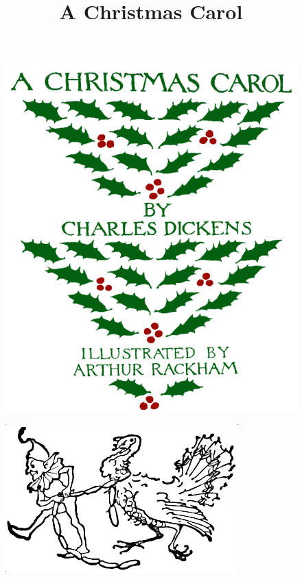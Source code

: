 \documentclass[paper=5.5in:8.5in,BCOR=5mm,twoside,DIV=calc,12pt,usegeometry]{scrbook} %
\begin{document}
\renewcommand*{\sectionmarkformat}{}
\renewcommand*\raggedchapter{\centering}
\pagestyle{empty}
\begin{figure}[p]
\begin{minipage}[c]{\linewidth}
\includegraphics[width=\linewidth]{newaccfront}
\end{minipage}
\end{figure}
\title{A Christmas Carol}


\renewcommand*{\chapterpagestyle}{empty}
\tableofcontents
\begin{figure}
\centering
\includegraphics[width=0.8\textwidth]{elfturkey}
\end{figure}
\clearpage
\pagestyle{headings}
\renewcommand*{\chapterpagestyle}{plain}
\end{document}
